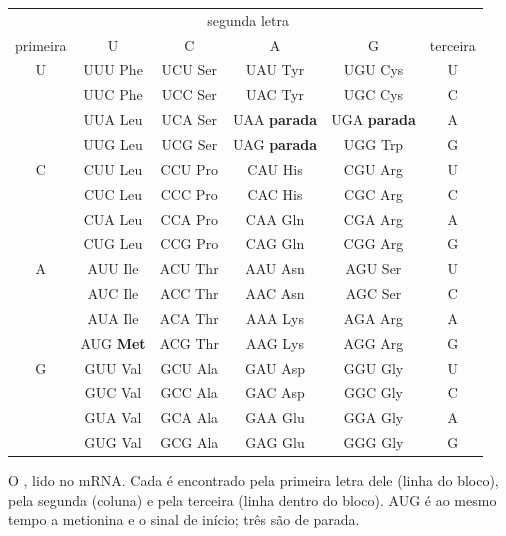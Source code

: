 \begin{omfigure}
\begin{tabular}{c|cccc|c}
\multicolumn{1}{c}{} & \multicolumn{4}{c}{\small segunda letra} & \multicolumn{1}{c}{} \\
{\small primeira} & U & C & A & G & {\small terceira} \\ \hline
U & UUU Phe & UCU Ser & UAU Tyr & UGU Cys & U \\
 & UUC Phe & UCC Ser & UAC Tyr & UGC Cys & C \\
 & UUA Leu & UCA Ser & UAA \textbf{parada} & UGA \textbf{parada} & A \\
 & UUG Leu & UCG Ser & UAG \textbf{parada} & UGG Trp & G \\ \hline
C & CUU Leu & CCU Pro & CAU His & CGU Arg & U \\
 & CUC Leu & CCC Pro & CAC His & CGC Arg & C \\
 & CUA Leu & CCA Pro & CAA Gln & CGA Arg & A \\
 & CUG Leu & CCG Pro & CAG Gln & CGG Arg & G \\ \hline
A & AUU Ile & ACU Thr & AAU Asn & AGU Ser & U \\
 & AUC Ile & ACC Thr & AAC Asn & AGC Ser & C \\
 & AUA Ile & ACA Thr & AAA Lys & AGA Arg & A \\
 & AUG \textbf{Met} & ACG Thr & AAG Lys & AGG Arg & G \\ \hline
G & GUU Val & GCU Ala & GAU Asp & GGU Gly & U \\
 & GUC Val & GCC Ala & GAC Asp & GGC Gly & C \\
 & GUA Val & GCA Ala & GAA Glu & GGA Gly & A \\
 & GUG Val & GCG Ala & GAG Glu & GGG Gly & G \\
\end{tabular}

{\small O , lido no mRNA. Cada  é encontrado pela
primeira letra dele (linha do bloco), pela segunda (coluna) e pela
terceira (linha dentro do bloco). AUG é ao mesmo tempo a metionina e o
sinal de início; três  são de parada.}
\end{omfigure}

